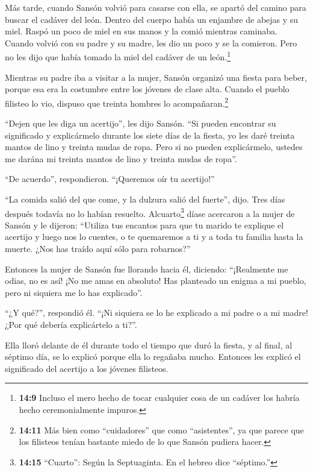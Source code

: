  Más tarde, cuando Sansón volvió para casarse con ella, se
apartó del camino para buscar el cadáver del león. Dentro del cuerpo
había un enjambre de abejas y su miel.  Raspó un poco de
miel en sus manos y la comió mientras caminaba. Cuando volvió con su
padre y su madre, les dio un poco y se la comieron. Pero no les dijo que
había tomado la miel del cadáver de un león.\footnote{\textbf{14:9}
  Incluso el mero hecho de tocar cualquier cosa de un cadáver los habría
  hecho ceremonialmente impuros.}

 Mientras su padre iba a visitar a la mujer, Sansón
organizó una fiesta para beber, porque esa era la costumbre entre los
jóvenes de clase alta.  Cuando el pueblo filisteo lo vio,
dispuso que treinta hombres lo acompañaran.\footnote{\textbf{14:11} Más
  bien como ``cuidadores'' que como ``asistentes'', ya que parece que
  los filisteos tenían bastante miedo de lo que Sansón pudiera hacer.}

 ``Dejen que les diga un acertijo'', les dijo Sansón. ``Si
pueden encontrar su significado y explicármelo durante los siete días de
la fiesta, yo les daré treinta mantos de lino y treinta mudas de ropa.
 Pero si no pueden explicármelo, ustedes me darána mi
treinta mantos de lino y treinta mudas de ropa''.

``De acuerdo'', respondieron. ``¡Queremos oír tu acertijo!''

 ``La comida salió del que come, y la dulzura salió del
fuerte'', dijo. Tres días después todavía no lo habían resuelto.
 Alcuarto\footnote{\textbf{14:15} ``Cuarto'': Según la
  Septuaginta. En el hebreo dice ``séptimo.''} díase acercaron a la
mujer de Sansón y le dijeron: ``Utiliza tus encantos para que tu marido
te explique el acertijo y luego nos lo cuentes, o te quemaremos a ti y a
toda tu familia hasta la muerte. ¿Nos has traído aquí sólo para
robarnos?''

 Entonces la mujer de Sansón fue llorando hacia él,
diciendo: ``¡Realmente me odias, no es así! ¡No me amas en absoluto! Has
planteado un enigma a mi pueblo, pero ni siquiera me lo has explicado''.

``¿Y qué?'', respondió él. ``¡Ni siquiera se lo he explicado a mi padre
o a mi madre! ¿Por qué debería explicártelo a ti?''.

 Ella lloró delante de él durante todo el tiempo que duró
la fiesta, y al final, al séptimo día, se lo explicó porque ella lo
regañaba mucho. Entonces les explicó el significado del acertijo a los
jóvenes filisteos.

